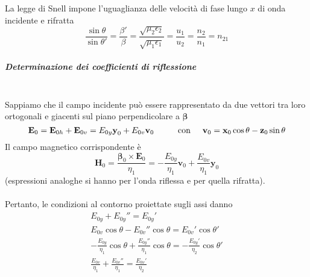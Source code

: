 \documentclass[a4paper]{article}
\begin{document}
La legge di Snell impone l'uguaglianza delle velocità di fase lungo $x$ di onda incidente e rifratta
\begin{equation*}
\frac{\sin\theta}{\sin\theta'}=\frac{\beta'}{\beta}=\frac{\sqrt{\mu_2\epsilon_2}}{\sqrt{\mu_1\epsilon_1}}=\frac{u_1}{u_2}=\frac{n_2}{n_1}=n_{21}
\end{equation*}
\subparagraph*{Determinazione dei coefficienti di riflessione\\\\}
Sappiamo che il campo incidente può essere rappresentato da due vettori tra loro ortogonali e giacenti sul piano perpendicolare a $\bm{\beta}$
\begin{equation*}
\textbf{E}_0=\textbf{E}_{0h}+\textbf{E}_{0v}=E_{0y}\textbf{y}_0+E_{0v}\textbf{v}_0\hspace{10mm}\text{con}\hspace{5mm}\textbf{v}_0=\textbf{x}_0\cos\theta-\textbf{z}_0\sin\theta
\end{equation*}
Il campo magnetico corrispondente è
\begin{equation*}
\textbf{H}_0=\frac{\bm{\beta}_0\times\textbf{E}_0}{\eta_1}=-\frac{E_{0y}}{\eta_1}\textbf{v}_0+\frac{E_{0v}}{\eta_1}\textbf{y}_0
\end{equation*}
(espressioni analoghe si hanno per l'onda riflessa e per quella rifratta).\\\\
Pertanto, le condizioni al contorno proiettate sugli assi danno
\begin{equation*}
\begin{array}{lr}
E_{0y}+E_{0y}''=E_{0y}'\\
E_{0v}\cos\theta-E_{0v}''\cos\theta=E_{0v}'\cos\theta'\\
-\frac{E_{0y}}{\eta_1}\cos\theta+\frac{E_{0y}''}{\eta_1}\cos\theta=-\frac{E_{0y}'}{\eta_2}\cos\theta'\\
\frac{E_{0v}}{\eta_1}+\frac{E_{0v}''}{\eta_1}=\frac{E_{0v}'}{\eta_2}\\
\end{array}
\end{equation*}
\end{document}
